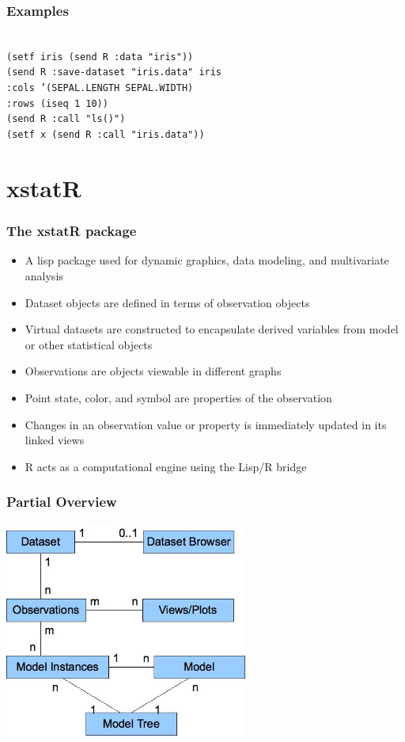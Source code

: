 \documentclass{beamer}
\begin{document}
\begin{frame}
\frametitle{Examples}
\texttt{
\\
(setf iris (send R :data "iris")) \\
(send R :save-dataset "iris.data" iris \\
	:cols '(SEPAL.LENGTH SEPAL.WIDTH) \\
	:rows (iseq 1 10)) \\
(send R :call "ls()") \\
(setf x (send R :call "iris.data")) 
}
\end{frame}

\section{xstatR}

\begin{frame}
\frametitle{The xstatR package}
\begin{itemize}
	\item A lisp package used for dynamic graphics, data modeling, and multivariate analysis
	\item Dataset objects are defined in terms of observation objects
	\item Virtual datasets are constructed to encapsulate derived variables from model or other statistical objects
	\item Observations are objects viewable in different graphs
	\item Point state, color, and symbol are properties of the observation
	\item Changes in an observation value or property is immediately updated in its linked views
	\item R acts as a computational engine using the Lisp/R bridge
\end{itemize}
\end{frame}

\begin{frame}
\frametitle{Partial Overview}
\begin{center}
	\includegraphics[width=0.6\textwidth]{xstatR.jpg}
\end{center}
\end{frame}
\end{document}
